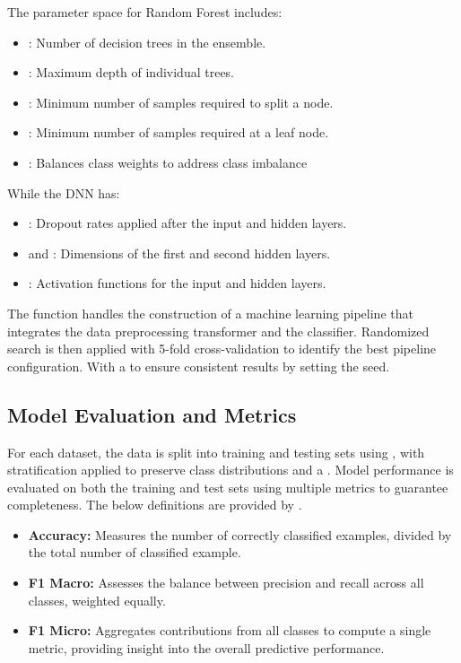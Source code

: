 The parameter space for Random Forest includes: 
\begin{itemize} 
\item {}: Number of decision trees in the ensemble.
\item {}: Maximum depth of individual trees.
\item {}: Minimum number of samples required to split a node.
\item {}: Minimum number of samples required at a leaf node.
\item {}: Balances class weights to address class imbalance
\end{itemize}

While the DNN has:
\begin{itemize}
    \item {}: Dropout rates applied after the input and hidden layers.
    \item {} and : Dimensions of the first and second hidden layers.
    \item {}: Activation functions for the input and hidden layers.
\end{itemize}

The  function handles the construction of a machine learning pipeline that integrates the data preprocessing transformer and the classifier. Randomized search is then applied with 5-fold cross-validation to identify the best pipeline configuration. With a  to ensure consistent results by setting the seed.

\subsection{Model Evaluation and Metrics} 
For each dataset, the data is split into training and testing sets using , with stratification applied to preserve class distributions and a . Model performance is evaluated on both the training and test sets using multiple metrics to guarantee completeness. The below definitions are provided by \citet{burkov2020machine}.

\begin{itemize} 
\item \textbf{Accuracy:} Measures the number of correctly classified examples, divided by the total
number of classified example.
\item \textbf{F1 Macro:} Assesses the balance between precision and recall across all classes, weighted equally.
\item \textbf{F1 Micro:} Aggregates contributions from all classes to compute a single metric, providing insight into the overall predictive performance. 
\end{itemize}

